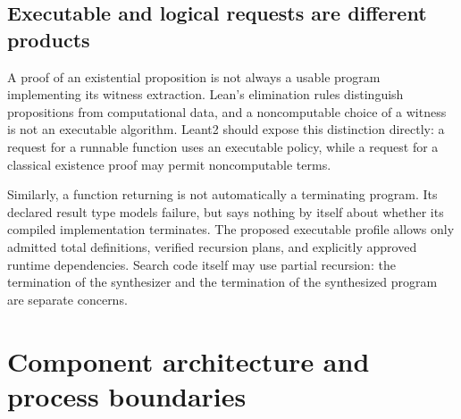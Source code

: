 \documentclass[11pt,letterpaper]{article}
\newcommand{\id}[1]{\texttt{\detokenize{#1}}}
\theoremstyle{definition}
\theoremstyle{remark}
\begin{document}
\subsection{Executable and logical requests are different products}

A proof of an existential proposition is not always a usable program implementing its witness extraction. Lean's elimination rules distinguish propositions from computational data, and a noncomputable choice of a witness is not an executable algorithm. Leant2 should expose this distinction directly: a request for a runnable function uses an executable policy, while a request for a classical existence proof may permit noncomputable terms.

Similarly, a function returning \id{Option A} is not automatically a terminating program. Its declared result type models failure, but says nothing by itself about whether its compiled implementation terminates. The proposed executable profile allows only admitted total definitions, verified recursion plans, and explicitly approved runtime dependencies. Search code itself may use partial recursion: the termination of the synthesizer and the termination of the synthesized program are separate concerns.

\section{Component architecture and process boundaries}
\label{sec:architecture}
\end{document}
